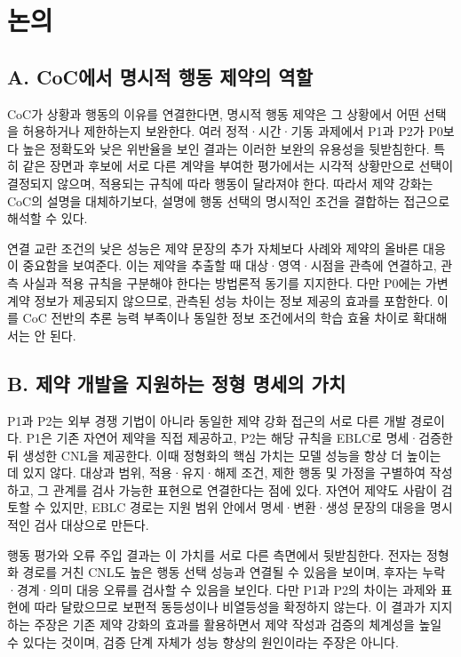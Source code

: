 \documentclass[11pt,a4paper]{article}
\begin{document}
\section*{논의}

\subsection*{A. CoC에서 명시적 행동 제약의 역할}

CoC가 상황과 행동의 이유를 연결한다면, 명시적 행동 제약은 그 상황에서 어떤 선택을 허용하거나 제한하는지 보완한다. 여러 정적·시간·기동 과제에서 P1과 P2가 P0보다 높은 정확도와 낮은 위반율을 보인 결과는 이러한 보완의 유용성을 뒷받침한다. 특히 같은 장면과 후보에 서로 다른 계약을 부여한 평가에서는 시각적 상황만으로 선택이 결정되지 않으며, 적용되는 규칙에 따라 행동이 달라져야 한다. 따라서 제약 강화는 CoC의 설명을 대체하기보다, 설명에 행동 선택의 명시적인 조건을 결합하는 접근으로 해석할 수 있다.\par

연결 교란 조건의 낮은 성능은 제약 문장의 추가 자체보다 사례와 제약의 올바른 대응이 중요함을 보여준다. 이는 제약을 추출할 때 대상·영역·시점을 관측에 연결하고, 관측 사실과 적용 규칙을 구분해야 한다는 방법론적 동기를 지지한다. 다만 P0에는 가변 계약 정보가 제공되지 않으므로, 관측된 성능 차이는 정보 제공의 효과를 포함한다. 이를 CoC 전반의 추론 능력 부족이나 동일한 정보 조건에서의 학습 효율 차이로 확대해서는 안 된다.\par

\subsection*{B. 제약 개발을 지원하는 정형 명세의 가치}

P1과 P2는 외부 경쟁 기법이 아니라 동일한 제약 강화 접근의 서로 다른 개발 경로이다. P1은 기존 자연어 제약을 직접 제공하고, P2는 해당 규칙을 EBLC로 명세·검증한 뒤 생성한 CNL을 제공한다. 이때 정형화의 핵심 가치는 모델 성능을 항상 더 높이는 데 있지 않다. 대상과 범위, 적용·유지·해제 조건, 제한 행동 및 가정을 구별하여 작성하고, 그 관계를 검사 가능한 표현으로 연결한다는 점에 있다. 자연어 제약도 사람이 검토할 수 있지만, EBLC 경로는 지원 범위 안에서 명세·변환·생성 문장의 대응을 명시적인 검사 대상으로 만든다.\par

행동 평가와 오류 주입 결과는 이 가치를 서로 다른 측면에서 뒷받침한다. 전자는 정형화 경로를 거친 CNL도 높은 행동 선택 성능과 연결될 수 있음을 보이며, 후자는 누락·경계·의미 대응 오류를 검사할 수 있음을 보인다. 다만 P1과 P2의 차이는 과제와 표현에 따라 달랐으므로 보편적 동등성이나 비열등성을 확정하지 않는다. 이 결과가 지지하는 주장은 기존 제약 강화의 효과를 활용하면서 제약 작성과 검증의 체계성을 높일 수 있다는 것이며, 검증 단계 자체가 성능 향상의 원인이라는 주장은 아니다.\par
\end{document}
